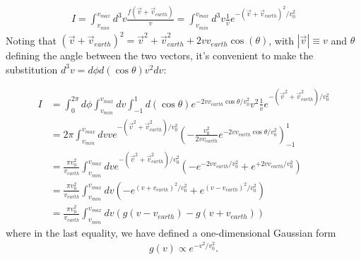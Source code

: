 \documentclass[11pt]{amsart}
\begin{document}
\begin{equation}
\begin{split}
	I = \int_{v_{min}}^{v_{max}} d^3v \frac{f(\vec{v} + \vec{v}_{earth})}{v} =
    	\int_{v_{min}}^{v_{max}} d^3v \frac{1}{v} e^{-(\vec{v}+\vec{v}_{earth})^2/v_0^2}
\end{split}
\end{equation}
Noting that $(\vec{v}+\vec{v}_{earth})^2 = \vec{v}^2 + \vec{v}^2_{earth} + 2vv_{earth}\cos(\theta)$, with $|\vec{v}|\equiv v$ and $\theta$ defining the angle between the two vectors, it's convenient to make the substitution $d^3v = d\phi d(\cos \theta) v^2 dv$:

\begin{equation}
\begin{split}
	I &=  \int_0^{2\pi} d\phi \int_{v_{min}}^{v_{max}} dv \int_{-1}^1 d(\cos \theta) e^{-2vv_{earth}\cos\theta/v_0^2} v^2 \frac{1}{v} e^{-(\vec{v}^2+\vec{v}^2_{earth})/v_0^2}\\
	&= 2\pi \int_{v_{min}}^{v_{max}} dv v e^{-(\vec{v}^2+\vec{v}^2_{earth})/v_0^2} \left(-\frac{v_0^2}{2vv_{earth}} e^{-2vv_{earth}\cos\theta/v_0^2}\right)_{-1}^1\\
	&= \frac{\pi v_0^2}{v_{earth} }\int_{v_{min}}^{v_{max}} dv e^{-(\vec{v}^2+\vec{v}^2_{earth})/v_0^2} 
		\left(- e^{-2vv_{earth}/v_0^2} + e^{+2vv_{earth}/v_0^2}\right)\\
	&= \frac{\pi v_0^2}{v_{earth} }\int_{v_{min}}^{v_{max}} dv 
		\left(- e^{(v+v_{earth})^2/v_0^2} + e^{(v-v_{earth})^2/v_0^2}\right)\\
	&= \frac{\pi v_0^2}{v_{earth} }\int_{v_{min}}^{v_{max}} dv 
		\left( g(v-v_{earth}) - g(v+v_{earth}) \right)
\end{split}
\end{equation}
where in the last equality, we have defined a one-dimensional Gaussian form
\begin{equation}
\begin{split}
	g(v) \propto e^{-v^2/v_0^2}.
\end{split}
\end{equation}
\end{document}
